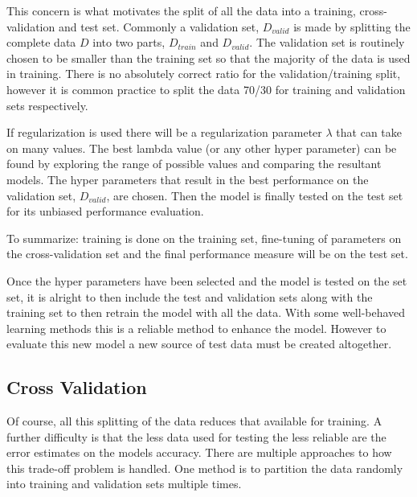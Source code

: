 This concern is what motivates the split of all the data into a training, cross-validation and test set.
Commonly a validation set, $D_{valid}$ is made by splitting the complete data $D$ into two parts, $D_{train}$ and $D_{valid}$.
The validation set is routinely chosen to be smaller than the training set so that the majority of the data is used in training.
There is no absolutely correct ratio for the validation/training split, however it is common practice to split the data 70/30 for training and validation sets respectively.

If regularization is used there will be a regularization parameter $\lambda$ that can take on many values.
The best lambda value (or any other hyper parameter) can be found by exploring the range of possible values and comparing the resultant models.
The hyper parameters that result in the best performance on the validation set, $D_{valid}$, are chosen.
Then the model is finally tested on the test set for its unbiased performance evaluation.

To summarize: training is done on the training set, fine-tuning of parameters on the cross-validation set and the final performance measure will be on the test set\citep{barber2012bayesian}.

Once the hyper parameters have been selected and the model is tested on the set set, it is alright to then include the test and validation sets along with the training set to then retrain the model with all the data.
With some well-behaved learning methods this is a reliable method to enhance the model\citep{witten2005data}.
However to evaluate this new model a new source of test data must be created altogether.


	\subsection{Cross Validation}

Of course, all this splitting of the data reduces that available for training.
A further difficulty is that the less data used for testing the less reliable are the error estimates on the models accuracy.
There are multiple approaches to how this trade-off problem is handled.
One method is to partition the data randomly into training and validation sets multiple times.

